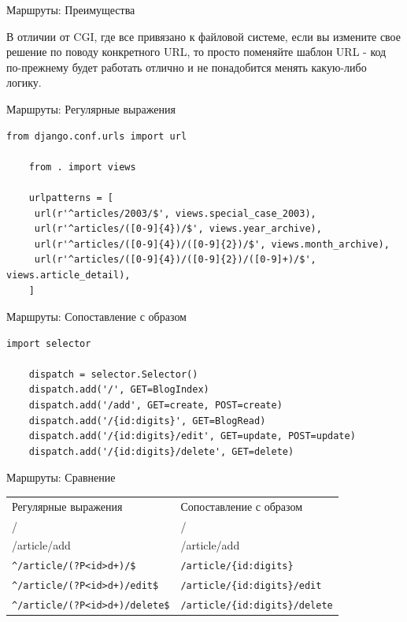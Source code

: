 \begin{frame}{Маршруты: Преимущества}

  В отличии от CGI, где все привязано к файловой системе,
  если вы измените свое решение по поводу конкретного URL, то просто поменяйте
  шаблон URL - код по-прежнему будет работать отлично и не понадобится менять
  какую-либо логику.

\end{frame}

\begin{frame}[fragile]{Маршруты: Регулярные выражения}

  \begin{lstlisting}[style=python]
    from django.conf.urls import url

    from . import views

    urlpatterns = [
     url(r'^articles/2003/$', views.special_case_2003),
     url(r'^articles/([0-9]{4})/$', views.year_archive),
     url(r'^articles/([0-9]{4})/([0-9]{2})/$', views.month_archive),
     url(r'^articles/([0-9]{4})/([0-9]{2})/([0-9]+)/$', views.article_detail),
    ]
    \end{lstlisting}

\end{frame}

\begin{frame}[fragile]{Маршруты: Сопоставление с образом}

  \begin{lstlisting}[style=python]
    import selector

    dispatch = selector.Selector()
    dispatch.add('/', GET=BlogIndex)
    dispatch.add('/add', GET=create, POST=create)
    dispatch.add('/{id:digits}', GET=BlogRead)
    dispatch.add('/{id:digits}/edit', GET=update, POST=update)
    dispatch.add('/{id:digits}/delete', GET=delete)
  \end{lstlisting}

\end{frame}


\begin{frame}[fragile]{Маршруты: Сравнение}

  \begin{table}[]
  \centering
  \label{my-label}
  \begin{tabular}{ll}
    Регулярные выражения & Сопоставление с образом \\
    / & / \\
    /article/add & /article/add \\
    \verb|^/article/(?P<id>d+)/$|       & \verb|/article/{id:digits}|      \\
    \verb|^/article/(?P<id>d+)/edit$|   & \verb|/article/{id:digits}/edit| \\
    \verb|^/article/(?P<id>d+)/delete$| & \verb|/article/{id:digits}/delete|

  \end{tabular}
  \end{table}

\end{frame}

